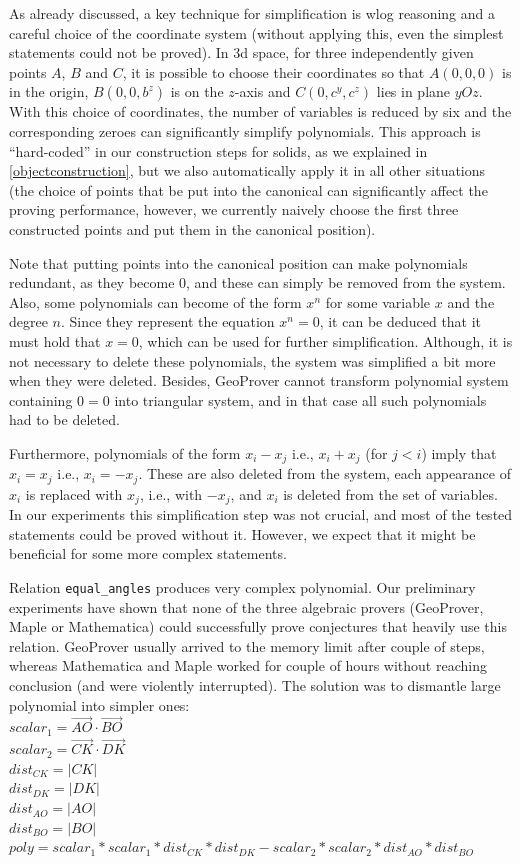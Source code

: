 \documentclass[final,1p,times,authoryear]{elsarticle}
\begin{document}
As already discussed, a key technique for simplification is wlog
reasoning and a careful choice of the coordinate system (without
applying this, even the simplest statements could not be proved). In
3d space, for three independently given points $A$, $B$ and $C$, it is
possible to choose their coordinates so that $A(0, 0, 0)$ is in the
origin, $B(0, 0, b^z)$ is on the $z$-axis and $C(0, c^y, c^z)$ lies in
plane $yOz$. With this choice of coordinates, the number of variables
is reduced by six and the corresponding zeroes can significantly
simplify polynomials. This approach is ``hard-coded'' in our
construction steps for solids, as we explained in
\ref{objectconstruction}, but we also automatically apply it in all
other situations (the choice of points that be put into the canonical
can significantly affect the proving performance, however, we
currently naively choose the first three constructed points and put
them in the canonical position).

Note that putting points into the canonical position can make
polynomials redundant, as they become $0$, and these can simply be
removed from the system. Also, some polynomials can become of the form
$x^n$ for some variable $x$ and the degree $n$. Since they represent
the equation $x^n=0$, it can be deduced that it must hold that $x=0$,
which can be used for further simplification. Although, it is not
necessary to delete these polynomials, the system was simplified a bit
more when they were deleted. Besides, GeoProver cannot transform
polynomial system containing $0 = 0$ into triangular system, and in
that case all such polynomials had to be deleted.

Furthermore, polynomials of the form $x_i - x_j$ i.e., $x_i + x_j$
(for $j < i$) imply that $x_i=x_j$ i.e., $x_i=-x_j$. These are also
deleted from the system, each appearance of $x_i$ is replaced with
$x_j$, i.e., with $-x_j$, and $x_i$ is deleted from the set of
variables. In our experiments this simplification step was not
crucial, and most of the tested statements could be proved without
it. However, we expect that it might be beneficial for some more
complex statements.

Relation {\tt equal\_angles} produces very complex polynomial. Our
preliminary experiments have shown that none of the three algebraic
provers (GeoProver, Maple or Mathematica) could successfully prove
conjectures that heavily use this relation. GeoProver usually arrived
to the memory limit after couple of steps, whereas Mathematica and
Maple worked for couple of hours without reaching conclusion (and were
violently interrupted). The solution was to dismantle large
polynomial into simpler ones: \\
$scalar_1 = \overrightarrow{AO}\cdot\overrightarrow{BO}$ \\
$scalar_2 = \overrightarrow{CK}\cdot\overrightarrow{DK}$ \\
$dist_{CK} = |CK|$ \\
$dist_{DK} = |DK|$ \\
$dist_{AO} = |AO|$ \\
$dist_{BO} = |BO|$ \\
$poly = scalar_1 * scalar_1 * dist_{CK} * dist_{DK} - scalar_2 * scalar_2 * dist_{AO} * dist_{BO}$ \\
\end{document}
